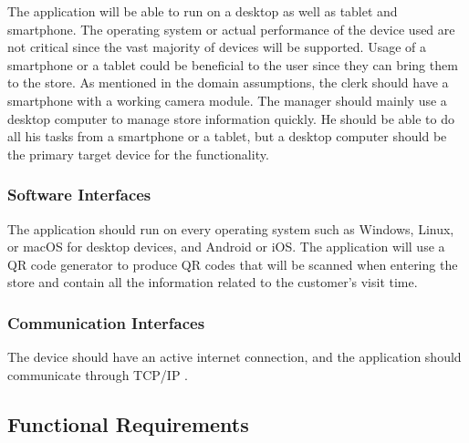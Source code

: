 The application will be able to run on a desktop as well as tablet and smartphone.
The operating system or actual performance of the device used are not critical since the vast majority of devices will be supported.
Usage of a smartphone or a tablet could be beneficial to the user since they can bring them to the store.
As mentioned in the domain assumptions, the clerk should have a smartphone with a working camera module.
The manager should mainly use a desktop computer to manage store information quickly.
He should be able to do all his tasks from a smartphone or a tablet, but a desktop computer should be the primary target device for the functionality.

\subsubsection{Software Interfaces}


The application should run on every operating system such as Windows, Linux, or macOS for desktop devices, and Android or iOS.
The application will use a QR code generator to produce QR codes that will be scanned when entering the store and contain all the information related to the customer's visit time.

\subsubsection{Communication Interfaces}

The device should have an active internet connection, and the application should communicate through TCP/IP .

\subsection{Functional Requirements}

